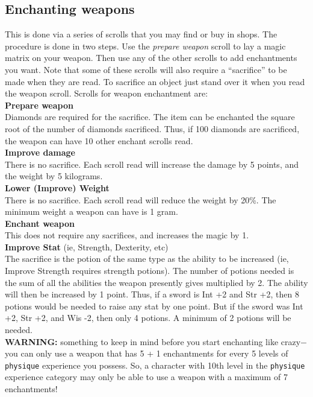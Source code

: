 \subsection{Enchanting weapons}

This is done via a series of scrolls that you
may find or buy in
shops. The procedure is done in two steps. Use the {\em prepare weapon} scroll
to lay a magic matrix on your weapon. Then use any of the other
scrolls to add enchantments you want. Note that some of these scrolls will
also require a ``sacrifice'' to be made when they are read. To sacrifice
an object just stand over it when you read the weapon scroll. Scrolls
for weapon enchantment are: \\

{\bf Prepare weapon} \\
Diamonds are required for the sacrifice. The item
can be enchanted the square root of the number of diamonds sacrificed. Thus,
if 100 diamonds are sacrificed, the weapon can have 10 other enchant scrolls
read. \\

{\bf Improve damage} \\
     There is no sacrifice. Each scroll read will increase the damage by 5
     points, and the weight by 5 kilograms. \\

{\bf Lower (Improve) Weight} \\
     There is no sacrifice. Each scroll read will reduce the weight by 20\%.
     The minimum weight a weapon can have is 1 gram. \\

{\bf Enchant weapon} \\
     This does not require any sacrifices, and increases the magic by 1. \\

{\bf Improve Stat} (ie, Strength, Dexterity, etc) \\
     The sacrifice is the potion of the same type
as the ability to be
     increased (ie, Improve Strength requires strength potions). The number
     of potions needed is the sum of all the abilities the weapon presently
     gives multiplied by 2. The ability will then be increased by 1 point.
     Thus, if a sword is Int +2 and Str +2, then 8 potions would be needed to
     raise any stat by one point. But if the sword was Int +2, Str +2, and Wis -2,
     then only 4 potions. A minimum of 2 potions will be needed. \\

{\bf WARNING:} something to keep in mind before you start enchanting
like crazy$-$you can only use a weapon that has 5 + 1 enchantments
for every 5 levels of
{\tt physique} experience you possess. So, a character with
10th level in the {\tt physique} experience category may only be able to
use a weapon with a maximum of 7 enchantments!
